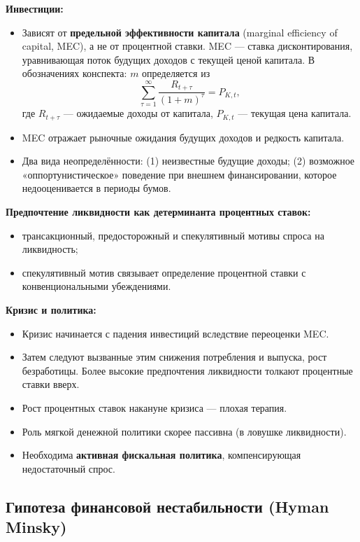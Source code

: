 \documentclass[10pt,a4paper]{article}
\begin{document}
\textbf{Инвестиции:}
\begin{itemize}[leftmargin=1.3em]
\item Зависят от \textbf{предельной эффективности капитала} (marginal efficiency of capital, MEC), а не от процентной ставки. MEC --- ставка дисконтирования, уравнивающая поток будущих доходов с текущей ценой капитала. В обозначениях конспекта: $m$ определяется из
\begin{equation*}
\sum_{\tau=1}^{\infty}\frac{R_{t+\tau}}{(1+m)^{\tau}} = P_{K,t},
\end{equation*}
где $R_{t+\tau}$ — ожидаемые доходы от капитала, $P_{K,t}$ — текущая цена капитала.
\item MEC отражает рыночные ожидания будущих доходов и редкость капитала.
\item Два вида неопределённости: (1) неизвестные будущие доходы; (2) возможное «оппортунистическое» поведение при внешнем финансировании, которое недооценивается в периоды бумов.
\end{itemize}

\textbf{Предпочтение ликвидности как детерминанта процентных ставок:}
\begin{itemize}[leftmargin=1.3em]
\item трансакционный, предосторожный и спекулятивный мотивы спроса на ликвидность;
\item спекулятивный мотив связывает определение процентной ставки с конвенциональными убеждениями.
\end{itemize}

\textbf{Кризис и политика:}
\begin{itemize}[leftmargin=1.3em]
\item Кризис начинается с падения инвестиций вследствие переоценки MEC.
\item Затем следуют вызванные этим снижения потребления и выпуска, рост безработицы. Более высокие предпочтения ликвидности толкают процентные ставки вверх.
\item Рост процентных ставок накануне кризиса — плохая терапия.
\item Роль мягкой денежной политики скорее пассивна (в ловушке ликвидности).
\item Необходима \textbf{активная фискальная политика}, компенсирующая недостаточный спрос.
\end{itemize}

\subsection{Гипотеза финансовой нестабильности (Hyman Minsky)}
\end{document}
